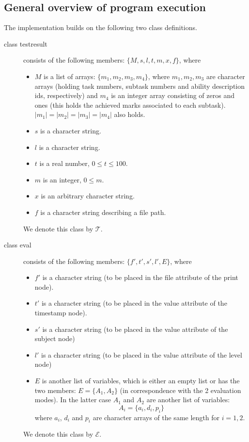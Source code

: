 \documentclass{scrartcl}
\begin{document}
\subsection{General overview of program execution}
The implementation builds on the following two class definitions.
\begin{description}
\item[class testresult] consists of the following members: $\{M,s,l,t,m,x,f\}$, where
\begin{itemize}
\item $M$ is a list of arrays: $\{m_1,m_2,m_3,m_4\}$, where $m_1,m_2,m_3$ are character arrays (holding task numbers, subtask numbers and ability description ids, respectively) and $m_4$ is an integer array consisting of zeros and ones (this holds the achieved marks associated to each subtask). $|m_1|=|m_2|=|m_3|=|m_4|$ also holds.
\item $s$ is a character string.
\item $l$ is a character string.
\item $t$ is a real number, $0\leq t \leq 100$.
\item $m$ is an integer, $0\leq m$.
\item $x$ is an arbitrary character string.
\item $f$ is a character string describing a file path.
\end{itemize}
We denote this class by $\mathcal{T}$.
\item[class eval] consists of the following members: $\{f',t',s',l',E\}$, where
\begin{itemize}
\item $f'$ is a character string (to be placed in the file attribute of the print node).
\item $t'$ is a character string (to be placed in the value attribute of the timestamp node). 
\item $s'$ is a character string (to be placed in the value attribute of the subject node)
\item $l'$ is a character string (to be placed in the value attribute of the level node)
\item $E$ is another list of variables, which is either an empty list or has the two members: $E=\{A_1,A_2\}$ (in correspondence with the 2 evaluation modes). In the latter case $A_1$ and $A_2$ are another list of variables: $$A_i=\{a_i,d_i,p_i\}$$ where $a_i$, $d_i$ and $p_i$ are character arrays of the same length for $i=1,2$.
\end{itemize}
We denote this class by $\mathcal{E}$.
\end{description}
\end{document}

